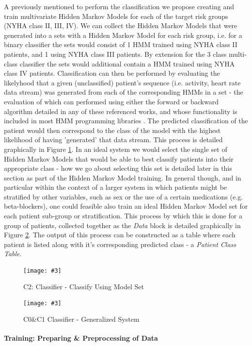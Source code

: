\documentclass[]{article}
\newcommand\landscapeFigure[4]{
	\newgeometry{left=#1,right=#1,top=#1}
	\begin{landscape}
		\begin{figure}
			\centering
			\texttt{[image: \#3]}
			\caption{#2}
			\label{#4}
		\end{figure}
	\end{landscape}
	\restoregeometry
}
\begin{document}
A previously mentioned to perform the classification we propose creating and train multivariate Hidden Markov Models for each of the target risk groups (NYHA class II, III, IV). We can collect the Hidden Markov Models that were generated into a sets with a Hidden Markov Model for each risk group, i.e. for a binary classifier the sets would consist of 1 HMM trained using NYHA class II patients, and 1 using NYHA class III patients. By extension for the 3 class multi-class classifier the sets would additional contain a HMM trained using NYHA class IV patients. Classification can then be performed by evaluating the likelyhood that a given (unclassified) patient's sequence (i.e. activity, heart rate data stream) was generated from each of the corresponding HMMs in a set - the evaluation of which can performed using either the forward or backward algorithm detailed in any of these referenced works, and whose functionality is included in most HMM programming libraries \cite{Jurafsky2017,Bobick2015a,Gagniuc2017,OConnell2011,Rabiner1989}. The predicted classification of the patient would then correspond to the class of the model with the highest likelihood of having 'generated' that data stream. This process is detailed graphically in Figure \ref{fig:C2}. In an ideal system we would select the single set of Hidden Markov Models that would be able to best classify patients into their appropriate class - how we go about selecting this set is detailed later in this section as part of the Hidden Markov Model training. In general though, and in particular within the context of a larger system in which patients might be stratified by other variables, such as sex or the use of a certain medications (e.g. beta-blockers), one could feasible also train an ideal Hidden Markov Model set for each patient sub-group or stratification. This process by which this is done for a group of patients, collected together as the \textit{Data} block is detailed graphically in Figure \ref{fig:C0C1}. The output of this process can be constructed as a table where each patient is listed along with it's corresponding predicted class - a \textit{Patient Class Table}.

\landscapeFigure{1cm}{C2: Classifier - Classify Using Model Set}{../modelDevelopmentFlowcharts/C2-Classifier_Classify_Using_Model_Set.png}{fig:C2}

\landscapeFigure{1cm}{C0\&C1 Classifier - Generalized System}{../modelDevelopmentFlowcharts/C0&C1-Classifier_Overview.png}{fig:C0C1}


\paragraph{Training: Preparing \& Preprocessing of Data}
\end{document}
